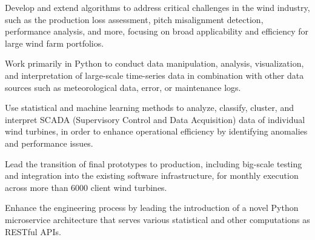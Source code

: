 \begin{tightemize}
    \item Develop and extend algorithms to address critical challenges in the wind industry, such as the production loss assessment, pitch misalignment detection, performance analysis, and more, focusing on broad applicability and efficiency for large wind farm portfolios.
    \item Work primarily in Python to conduct data manipulation, analysis, visualization, and interpretation of large-scale time-series data in combination with other data sources such as meteorological data, error, or maintenance logs.
    \item Use statistical and machine learning methods to analyze, classify, cluster, and interpret SCADA (Supervisory Control and Data Acquisition) data of individual wind turbines, in order to enhance operational efficiency by identifying anomalies and performance issues.
    \item Lead the transition of final prototypes to production, including big-scale testing and integration into the existing software infrastructure, for monthly execution across more than 6000 client wind turbines.
    \item Enhance the engineering process by leading the introduction of a novel Python microservice architecture that serves various statistical and other computations as RESTful APIs.
\end{tightemize}